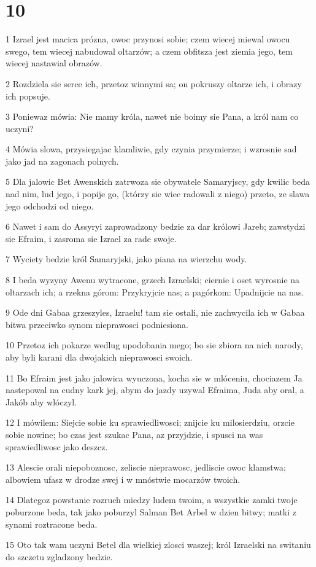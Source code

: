 \chapter{10}

\par 1 Izrael jest macica prózna, owoc przynosi sobie; czem wiecej miewal owocu swego, tem wiecej nabudowal oltarzów; a czem obfitsza jest ziemia jego, tem wiecej nastawial obrazów.
\par 2 Rozdziela sie serce ich, przetoz winnymi sa; on pokruszy oltarze ich, i obrazy ich popsuje.
\par 3 Poniewaz mówia: Nie mamy króla, nawet nie boimy sie Pana, a król nam co uczyni?
\par 4 Mówia slowa, przysiegajac klamliwie, gdy czynia przymierze; i wzrosnie sad jako jad na zagonach polnych.
\par 5 Dla jalowic Bet Awenskich zatrwoza sie obywatele Samaryjscy, gdy kwilic beda nad nim, lud jego, i popije go, (którzy sie wiec radowali z niego) przeto, ze slawa jego odchodzi od niego.
\par 6 Nawet i sam do Assyryi zaprowadzony bedzie za dar królowi Jareb; zawstydzi sie Efraim, i zasroma sie Izrael za rade swoje.
\par 7 Wyciety bedzie król Samaryjski, jako piana na wierzchu wody.
\par 8 I beda wyzyny Awenu wytracone, grzech Izraelski; ciernie i oset wyrosnie na oltarzach ich; a rzekna górom: Przykryjcie nas; a pagórkom: Upadnijcie na nas.
\par 9 Ode dni Gabaa grzeszyles, Izraelu! tam sie ostali, nie zachwycila ich w Gabaa bitwa przeciwko synom nieprawosci podniesiona.
\par 10 Przetoz ich pokarze wedlug upodobania mego; bo sie zbiora na nich narody, aby byli karani dla dwojakich nieprawosci swoich.
\par 11 Bo Efraim jest jako jalowica wyuczona, kocha sie w mlóceniu, chociazem Ja nastepowal na cudny kark jej, abym do jazdy uzywal Efraima, Juda aby oral, a Jakób aby wlóczyl.
\par 12 I mówilem: Siejcie sobie ku sprawiedliwosci; znijcie ku milosierdziu, orzcie sobie nowine; bo czas jest szukac Pana, az przyjdzie, i spusci na was sprawiedliwosc jako deszcz.
\par 13 Alescie orali niepoboznosc, zeliscie nieprawosc, jedliscie owoc klamstwa; albowiem ufasz w drodze swej i w mnóstwie mocarzów twoich.
\par 14 Dlategoz powstanie rozruch miedzy ludem twoim, a wszystkie zamki twoje poburzone beda, tak jako poburzyl Salman Bet Arbel w dzien bitwy; matki z synami roztracone beda.
\par 15 Oto tak wam uczyni Betel dla wielkiej zlosci waszej; król Izraelski na switaniu do szczetu zgladzony bedzie.

